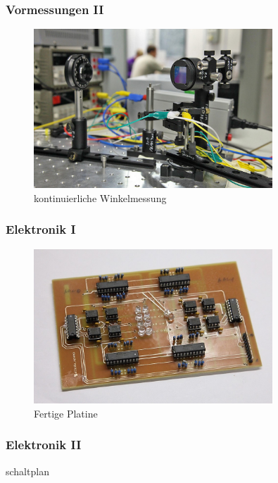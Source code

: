 \documentclass[10pt]{beamer}
\begin{document}
{
\frametitle{Vormessungen II}
\begin{figure}
\begin{center}
\includegraphics[width=0.8\textwidth]{./images/prIMG_7244bh}
\caption{kontinuierliche Winkelmessung}
\end{center}
\end{figure}
}
\frame
{
\frametitle{Elektronik I}
\begin{figure}
\begin{center}
\includegraphics[width=0.8\textwidth]{./images/prIMG_7253crop.jpg}
\caption{Fertige Platine}
\end{center}
\end{figure}
}
\frame
{
\frametitle{Elektronik II}
schaltplan
}
\frame
\end{document}
